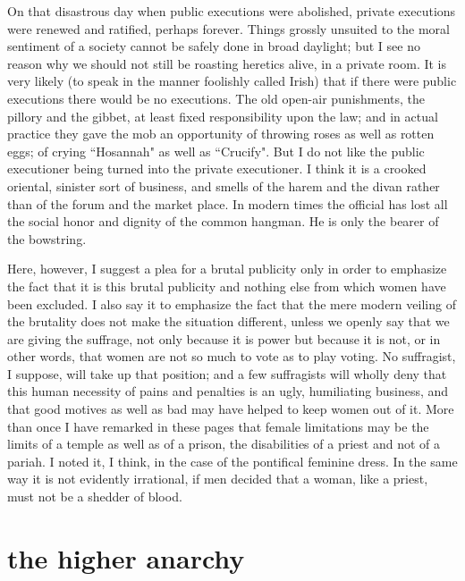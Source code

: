 \documentclass[final,10pt,letterpaper,twocolumn,openany]{book}
\begin{document}
On that disastrous day when public executions were abolished, private
executions were renewed and ratified, perhaps forever. Things grossly
unsuited to the moral sentiment of a society cannot be safely done in broad
daylight; but I see no reason why we should not still be roasting heretics
alive, in a private room. It is very likely (to speak in the manner foolishly
called Irish) that if there were public executions there would be no
executions. The old open-air punishments, the pillory and the gibbet, at
least fixed responsibility upon the law; and in actual practice they gave the
mob an opportunity of throwing roses as well as rotten eggs; of crying
``Hosannah" as well as ``Crucify". But I do not like the public executioner
being turned into the private executioner. I think it is a crooked oriental,
sinister sort of business, and smells of the harem and the divan rather than
of the forum and the market place. In modern times the official has lost all
the social honor and dignity of the common hangman. He is only the
bearer of the bowstring.

Here, however, I suggest a plea for a brutal publicity only in order to
emphasize the fact that it is this brutal publicity and nothing else from
which women have been excluded. I also say it to emphasize the fact that
the mere modern veiling of the brutality does not make the situation
different, unless we openly say that we are giving the suffrage, not only
because it is power but because it is not, or in other words, that women are
not so much to vote as to play voting. No suffragist, I suppose, will take
up that position; and a few suffragists will wholly deny that this human
necessity of pains and penalties is an ugly, humiliating business, and that
good motives as well as bad may have helped to keep women out of it.
More than once I have remarked in these pages that female limitations
may be the limits of a temple as well as of a prison, the disabilities of a
priest and not of a pariah. I noted it, I think, in the case of the pontifical
feminine dress. In the same way it is not evidently irrational, if men
decided that a woman, like a priest, must not be a shedder of blood.

\section{the higher anarchy}
\end{document}
